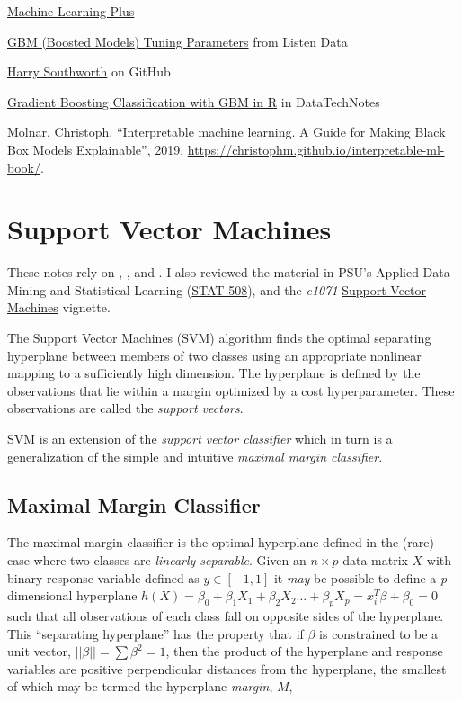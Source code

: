 \documentclass[
]{book}
\begin{document}
\href{https://www.machinelearningplus.com/machine-learning/caret-package/}{Machine Learning Plus}

\href{https://www.listendata.com/2015/07/gbm-boosted-models-tuning-parameters.html}{GBM (Boosted Models) Tuning Parameters} from Listen Data

\href{https://github.com/harrysouthworth/gbm/blob/master/demo/bernoulli.R}{Harry Southworth} on GitHub

\href{https://www.datatechnotes.com/2018/03/classification-with-gradient-boosting.html}{Gradient Boosting Classification with GBM in R} in DataTechNotes

Molnar, Christoph. ``Interpretable machine learning. A Guide for Making Black Box Models Explainable'', 2019. \url{https://christophm.github.io/interpretable-ml-book/}.

\hypertarget{support-vector-machines}{%
\chapter{Support Vector Machines}\label{support-vector-machines}}

These notes rely on \citep{James2013}, \citep{Hastie2017}, and \citep{Kuhn2016}. I also reviewed the material in PSU's Applied Data Mining and Statistical Learning (\href{https://online.stat.psu.edu/stat508/}{STAT 508}), and the \emph{e1071} \href{https://cran.r-project.org/web/packages/e1071/vignettes/svmdoc.pdf}{Support Vector Machines} vignette.

The Support Vector Machines (SVM) algorithm finds the optimal separating hyperplane between members of two classes using an appropriate nonlinear mapping to a sufficiently high dimension. The hyperplane is defined by the observations that lie within a margin optimized by a cost hyperparameter. These observations are called the \emph{support vectors}.

SVM is an extension of the \emph{support vector classifier} which in turn is a generalization of the simple and intuitive \emph{maximal margin classifier}.

\hypertarget{maximal-margin-classifier}{%
\section{Maximal Margin Classifier}\label{maximal-margin-classifier}}

The maximal margin classifier is the optimal hyperplane defined in the (rare) case where two classes are \emph{linearly separable}. Given an \(n \times p\) data matrix \(X\) with binary response variable defined as \(y \in [-1, 1]\) it \emph{may} be possible to define a \emph{p}-dimensional hyperplane \(h(X) = \beta_0 + \beta_1X_1 + \beta_2X_2 \dots + \beta_pX_p = x_i^T \beta + \beta_0 = 0\) such that all observations of each class fall on opposite sides of the hyperplane. This ``separating hyperplane'' has the property that if \(\beta\) is constrained to be a unit vector, \(||\beta|| = \sum\beta^2 = 1\), then the product of the hyperplane and response variables are positive perpendicular distances from the hyperplane, the smallest of which may be termed the hyperplane \emph{margin}, \(M\),
\end{document}
